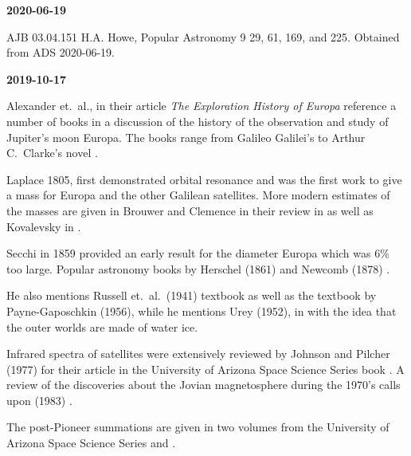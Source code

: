 
{\bf 2020-06-19}

AJB 03.04.151 H.A. Howe, 
Popular Astronomy 9 29, 61, 169, and 225. Obtained from ADS 2020-06-19.

{\bf 2019-10-17}

Alexander et.\ al., in their article {\it The Exploration History of
Europa} \cite{Alexander2009} reference a number of books in a
discussion of the history of the observation and study of Jupiter's
moon Europa.  The books range from Galileo Galilei's  \cite{Galilei1989} to Arthur C.\ Clarke's novel  \cite{Clarke1982}.

Laplace 1805,  \cite{Laplace1805} first
demonstrated orbital resonance and was the first work to give a mass
for Europa and the other Galilean satellites. More modern estimates of
the masses are given in Brouwer and Clemence \cite{Brouwer1961} in
their review in  \cite{Kuiper1961} as well
as Kovalevsky \cite{Kovalevsky1970} in  \cite{Dollfus1970}.

Secchi in 1859 \cite{Secchi1859} provided an early result for the
diameter Europa which was 6\% too large.  Popular astronomy books by
Herschel (1861) \cite{Herschel1861} and Newcomb
(1878) \cite{Newcomb1878}.

He also mentions Russell et.\ al.\ (1941) \cite{Russell1941} textbook
 as well as the textbook by Payne-Gaposchkin (1956),
 \cite{Payne-Gaposchkin1956} while he mentions
Urey (1952), in  \cite{Urey1952} with the idea that
the outer worlds are made of water ice.

Infrared spectra of satellites were extensively reviewed by Johnson
and Pilcher (1977) \cite{Johnson1977} for their article in the
University of Arizona Space Science Series book  \cite{Burns1977}. A review of the discoveries about
the Jovian magnetosphere during the 1970's calls upon  (1983) \cite{Dressler1983}.

The post-Pioneer summations are given in two volumes from the
University of Arizona Space Science Series  \cite{Burns1977} and \cite{Gehrels1976}.


 \cite{Morrison1982}
